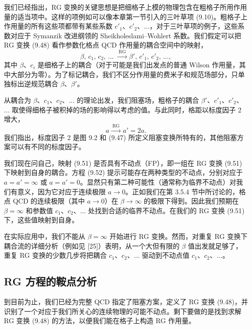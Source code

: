 我们已经指出，RG 变换的关键思想是把细格子上模的物理包含在粗格子所用作用量的适当项中。这样的项例如可以像本章第一节引入的三叶草项 (9.10)。粗格子上作用量的所有这些项都带有某些系数 $c'_1$、$c'_2$、$\ldots$，对于三叶草项的例子，这些系数对应于 Symanzik 改进纲领的 Sheikholeslami--Wohlert 系数。我们假定可以把 RG 变换 (9.48) 看作参数化格点 QCD 作用量的耦合空间中的映射，
\begin{equation}
  \beta,\,c_1,\,c_2,\,\ldots\;\xrightarrow{\;\mathrm{RG}\;}
    \beta',\,c'_1,\,c'_2,\,\ldots ,
\end{equation}
其中 $\beta$、$c_i$ 是细格子上的耦合（对于可能是我们出发点的普通 Wilson 作用量，其中大部分为零）。为了标记耦合，我们不区分作用量的费米子和规范场部分，只单独标出逆规范耦合 $\beta$、$\beta'$。

从耦合为 $\beta$、$c_1$、$c_2$、$\ldots$ 的理论出发，我们阻塞场，粗格子的耦合 $\beta'$、$c'_1$、$c'_2$、$\ldots$ 取使得细格子被积掉的场的影响得以考虑的值。与此同时，格距以标度因子 2 增大，
\begin{equation}
  a \xrightarrow{\;\mathrm{RG}\;} a' = 2a .
\end{equation}
我们指出，标度因子 2 是图 9.2 和 (9.47) 所定义阻塞变换所特有的，其他阻塞方案可以有不同的标度因子。

我们现在问自己，映射 (9.51) 是否具有不动点（FP），即一组在 RG 变换 (9.51) 下映射到自身的耦合。方程 (9.52) 提示可能存在两种类型的不动点，分别对应于 $a = a' = \infty$ 或 $a = a' = 0$。显然只有第二种可能性（通常称为临界不动点）对我们有意义，因为它对应于连续极限 $a \to 0$。正如我们在第 3.5.4 节中所讨论的，格点 QCD 的连续极限（其中 $a \to 0$）在 $\beta \to \infty$ 的极限下得到。因此我们预期在 $\beta = \infty$ 和参数值 $c_1$、$c_2$、$\ldots$ 处找到合适的临界不动点。在我们的 RG 变换 (9.51) 下，这些值映射到自身。

在实际应用中，我们不能从 $\beta = \infty$ 开始进行 RG 变换。然而，对重复 RG 变换下耦合流的详细分析（例如见 [25]）表明，从一个大但有限的 $\beta$ 值出发就足够了，重复 RG 变换的少数几步将把耦合 $c_1$、$c_2$、$\ldots$ 驱动到不动点值 $c_1$、$c_2$、$\ldots$。

\subsection{RG 方程的鞍点分析}
\label{sec:9.3.3}

到目前为止，我们已经为完整 QCD 指定了阻塞方案，定义了 RG 变换 (9.48)，并识别了一个对应于我们所关心的连续物理的可能不动点。剩下要做的是找到求解 RG 变换 (9.48) 的方法，以便我们能在格子上构造 RG 作用量。

